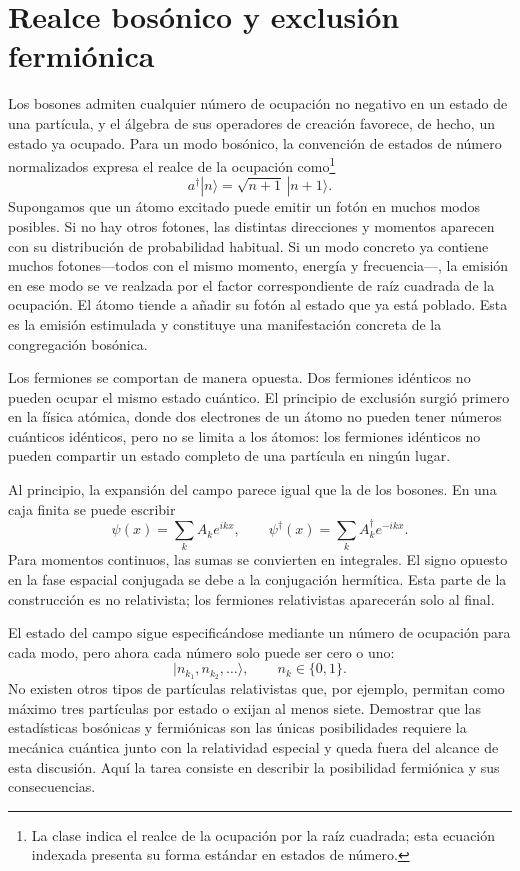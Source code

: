 \section{Realce bosónico y exclusión fermiónica}

Los bosones admiten cualquier número de ocupación no negativo en un estado de una partícula, y el álgebra de sus operadores de creación favorece, de hecho, un estado ya ocupado. Para un modo bosónico, la convención de estados de número normalizados expresa el realce de la ocupación como\footnote{La clase indica el realce de la ocupación por la raíz cuadrada; esta ecuación indexada presenta su forma estándar en estados de número.}\begin{equation}
a^\dagger|n\rangle=\sqrt{n+1}\,|n+1\rangle.
\end{equation}
Supongamos que un átomo excitado puede emitir un fotón en muchos modos posibles. Si no hay otros fotones, las distintas direcciones y momentos aparecen con su distribución de probabilidad habitual. Si un modo concreto ya contiene muchos fotones---todos con el mismo momento, energía y frecuencia---, la emisión en ese modo se ve realzada por el factor correspondiente de raíz cuadrada de la ocupación. El átomo tiende a añadir su fotón al estado que ya está poblado. Esta es la emisión estimulada y constituye una manifestación concreta de la congregación bosónica.

Los fermiones se comportan de manera opuesta. Dos fermiones idénticos no pueden ocupar el mismo estado cuántico. El principio de exclusión surgió primero en la física atómica, donde dos electrones de un átomo no pueden tener números cuánticos idénticos, pero no se limita a los átomos: los fermiones idénticos no pueden compartir un estado completo de una partícula en ningún lugar.

Al principio, la expansión del campo parece igual que la de los bosones. En una caja finita se puede escribir
\begin{equation}
\psi(x)=\sum_k A_k e^{ikx},
\qquad
\psi^\dagger(x)=\sum_k A_k^\dagger e^{-ikx}.
\end{equation}
Para momentos continuos, las sumas se convierten en integrales. El signo opuesto en la fase espacial conjugada se debe a la conjugación hermítica. Esta parte de la construcción es no relativista; los fermiones relativistas aparecerán solo al final.

El estado del campo sigue especificándose mediante un número de ocupación para cada modo, pero ahora cada número solo puede ser cero o uno:
\begin{equation}
|n_{k_1},n_{k_2},\ldots\rangle,
\qquad n_k\in\{0,1\}.
\end{equation}
No existen otros tipos de partículas relativistas que, por ejemplo, permitan como máximo tres partículas por estado o exijan al menos siete. Demostrar que las estadísticas bosónicas y fermiónicas son las únicas posibilidades requiere la mecánica cuántica junto con la relatividad especial y queda fuera del alcance de esta discusión. Aquí la tarea consiste en describir la posibilidad fermiónica y sus consecuencias.


